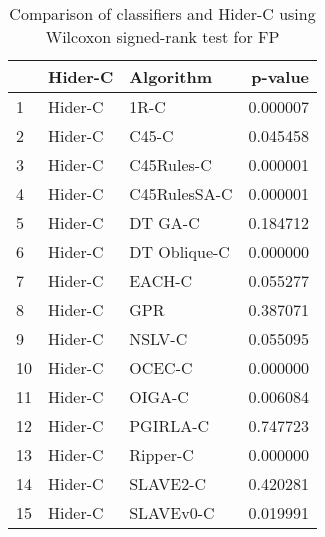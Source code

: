 \begin{table}
\footnotesize
\caption{Comparison of classifiers and Hider-C using Wilcoxon signed-rank test for FP}
\label{tab:Hider-C wilcoxon FP comparison}
\begin{tabular}{lllr}
\hline
 & Hider-C & Algorithm & p-value \\
\hline
1 & Hider-C & 1R-C & 0.000007 \\
2 & Hider-C & C45-C & 0.045458 \\
3 & Hider-C & C45Rules-C & 0.000001 \\
4 & Hider-C & C45RulesSA-C & 0.000001 \\
5 & Hider-C & DT GA-C & 0.184712 \\
6 & Hider-C & DT Oblique-C & 0.000000 \\
7 & Hider-C & EACH-C & 0.055277 \\
8 & Hider-C & GPR & 0.387071 \\
9 & Hider-C & NSLV-C & 0.055095 \\
10 & Hider-C & OCEC-C & 0.000000 \\
11 & Hider-C & OIGA-C & 0.006084 \\
12 & Hider-C & PGIRLA-C & 0.747723 \\
13 & Hider-C & Ripper-C & 0.000000 \\
14 & Hider-C & SLAVE2-C & 0.420281 \\
15 & Hider-C & SLAVEv0-C & 0.019991 \\
\hline
\end{tabular}
\end{table}
